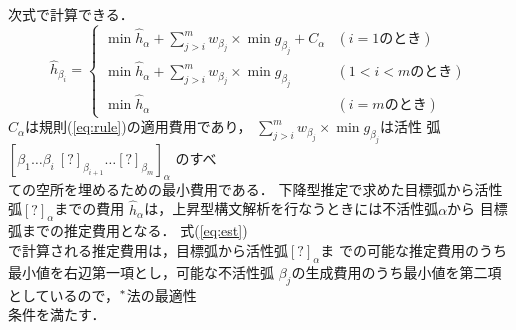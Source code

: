 次式で計算できる．
\begin{equation}
\hat{h}_{\beta_i} =
\left\{
\begin{array}{ll}
\min \hat{h}_\alpha + \displaystyle \sum_{j>i}^m w_{\beta_j} \times \min g_{\beta_j} + C_\alpha & (i = 1 のとき) \\
\min \hat{h}_\alpha + \displaystyle \sum_{j>i}^m w_{\beta_j} \times \min g_{\beta_j} & (1 < i < m のとき) \\
\min \hat{h}_\alpha & (i =m のとき)
\end{array}
\right.
\label{eq:est}
\end{equation}
$C_\alpha$は規則(\ref{eq:rule})の適用費用であり，
$\displaystyle \sum_{j>i}^m w_{\beta_j} \times \min g_{\beta_j}$は活性
弧
$[\beta_1 \ldots \beta_i\ [?]_{\beta_{i+1}} \ldots [?]_{\beta_{m}}]_\alpha$
のすべ\\ての空所を埋めるための最小費用である．
下降型推定で求めた目標弧から活性弧$[?]_\alpha$までの費用
$\hat{h}_\alpha$は，\hspace*{-0.4mm}上昇型構文解析を行なうときには不活性弧$\alpha$から
目標弧までの推定費用となる．
\hspace*{-0.4mm}式(\ref{eq:est})\\で計算される推定費用は，目標弧から活性弧$[?]_\alpha$ま
での可能な推定費用のうち最小値を右辺第一項とし，\hspace*{-0.4mm}可能な不活性弧
$\beta_j$の生成費用のうち最小値を第二項としているので，\hspace*{-0.4mm}$^*$法の最適性\\条件を満たす．

